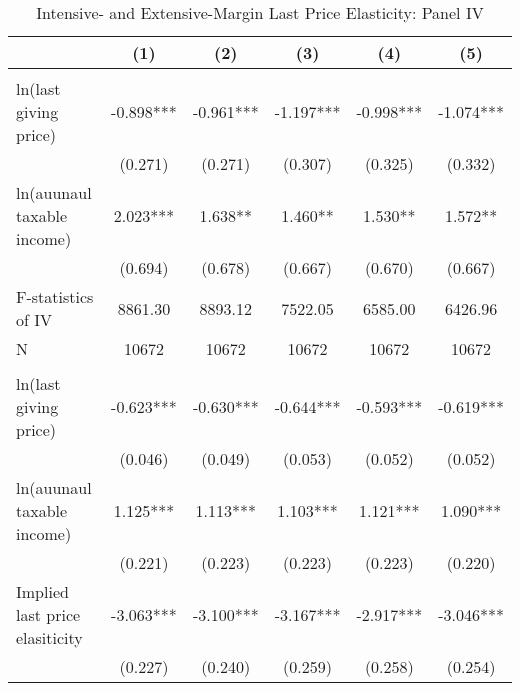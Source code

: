 \documentclass[ review  , 3p ]{elsarticle}
\begin{document}
  \begin{table}

  \caption{\label{tab:kableLastElasticity2}Intensive- and Extensive-Margin Last Price Elasticity: Panel IV}
  \centering
  \fontsize{7}{9}\selectfont
  \begin{threeparttable}
  \begin{tabular}[t]{lccccc}
  \toprule
   & (1) & (2) & (3) & (4) & (5)\\
  \midrule
  \addlinespace[0.3em]
  \multicolumn{6}{l}{\textbf{Intensive-Margin Elasticity}}\\
  \hspace{1em}ln(last giving price) & -0.898*** & -0.961*** & -1.197*** & -0.998*** & -1.074***\\
  \hspace{1em} & (0.271) & (0.271) & (0.307) & (0.325) & (0.332)\\
  \hspace{1em}ln(auunaul taxable income) & 2.023*** & 1.638** & 1.460** & 1.530** & 1.572**\\
  \hspace{1em} & (0.694) & (0.678) & (0.667) & (0.670) & (0.667)\\
  \hspace{1em}F-statistics of IV & 8861.30 & 8893.12 & 7522.05 & 6585.00 & 6426.96\\
  \hspace{1em}N & 10672 & 10672 & 10672 & 10672 & 10672\\
  \addlinespace[0.3em]
  \multicolumn{6}{l}{\textbf{Extensive-Margin Elasticity}}\\
  \hspace{1em}ln(last giving price) & -0.623*** & -0.630*** & -0.644*** & -0.593*** & -0.619***\\
  \hspace{1em} & (0.046) & (0.049) & (0.053) & (0.052) & (0.052)\\
  \hspace{1em}ln(auunaul taxable income) & 1.125*** & 1.113*** & 1.103*** & 1.121*** & 1.090***\\
  \hspace{1em} & (0.221) & (0.223) & (0.223) & (0.223) & (0.220)\\
  \hspace{1em}Implied last price elasiticity & -3.063*** & -3.100*** & -3.167*** & -2.917*** & -3.046***\\
  \hspace{1em} & (0.227) & (0.240) & (0.259) & (0.258) & (0.254)\\

\end{tabular}
\end{threeparttable}
\end{table}
\end{document}
